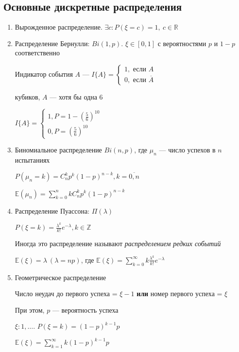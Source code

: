 \documentclass[a4paper, 10pt]{article}
\begin{document}
\subsection{Основные дискретные распределения}
\begin{enumerate}
    \item Вырожденное распределение. $\exists c:P(\xi=c)=1,\ c\in\mathbb{R}$
    \item Распределение Бернулли: $Bi(1,p)$. $\xi\in[0,1]$ с вероятностями $p$ и $1-p$ соответственно

    Индикатор события $A$ — $I\{A\}=\begin{cases}
        1,\text{ если }A\\
        0,\text{ если }\overline{A}
    \end{cases}$

     кубиков, $A$ — хотя бы одна 6

    $I\{A\}=\begin{cases}
        1, P=1-\left(\frac{5}{6}\right)^{10}\\
        0, P=\left(\frac{5}{6}\right)^{10}
    \end{cases}$
    \item Биномиальное распределение $Bi(n,p)$, где $\mu_n$ — число успехов в $n$ испытаниях

    $P(\mu_n=k)=C_n^kp^{k}(1-p)^{n-k},k=\overline{0,n}$

    $\mathbb{E}(\mu_n)=\sum_{k=0}^{n}kC_n^kp^k(1-p)^{n-k}$

    \item Распределение Пуассона: $\Pi(\lambda)$

    $P(\xi=k)=\displaystyle\frac{\lambda^k}{k!}e^{-\lambda},k\in\mathbb{Z}$

    Иногда это распределение называют \textit{распределением редких событий}

    $\mathbb{E}(\xi)=\lambda\ (\lambda=np)$, где $\mathbb{E}(\xi)=\sum_{k=0}^{\infty} k\displaystyle\frac{\lambda^k}{k!}e^{-\lambda}$

    \item Геометрическое распределение
    
    \ex Число неудач до первого успеха = $\xi-1$ \textbf{или} номер первого успеха = $\xi$
    
    При этом, $p$ — вероятность успеха

    $\xi:1,\ldots$. $P(\xi=k)=(1-p)^{k-1}p$

     $\mathbb{E}(\xi)=\sum_{k=1}^{\infty} k(1-p)^{k-1}p$


\end{enumerate}
\end{document}
